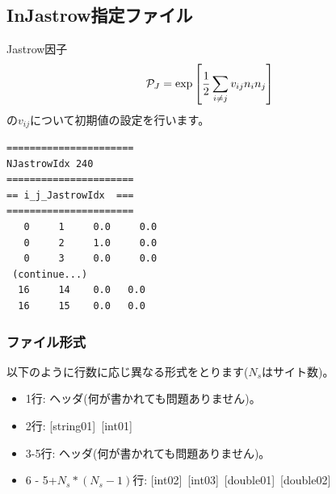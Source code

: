 \newpage
\subsection{InJastrow指定ファイル}
\label{Subsec:InJastrow}
Jastrow因子
\begin{equation}
{\cal P}_J=\exp\left[\frac{1}{2} \sum_{i\neq j} v_{ij} n_i n_j\right]
\end{equation}
の$v_{ij}$について初期値の設定を行います。

\begin{minipage}{12.5cm}
\begin{screen}
\begin{verbatim}
======================
NJastrowIdx 240 
====================== 
== i_j_JastrowIdx  ===
====================== 
   0     1     0.0     0.0 
   0     2     1.0     0.0
   0     3     0.0     0.0
 (continue...)
  16     14    0.0   0.0
  16     15    0.0   0.0
\end{verbatim}
\end{screen}
\end{minipage}

\subsubsection{ファイル形式}
以下のように行数に応じ異なる形式をとります($N_s$はサイト数)。
 \begin{itemize}
   \item  1行:  ヘッダ(何が書かれても問題ありません)。
   \item  2行:   [string01]~[int01]
   \item  3-5行:  ヘッダ(何が書かれても問題ありません)。
   \item  6 - 5+$N_s*(N_s-1)$行: [int02]~[int03]~[double01]~[double02]
  \end{itemize}
